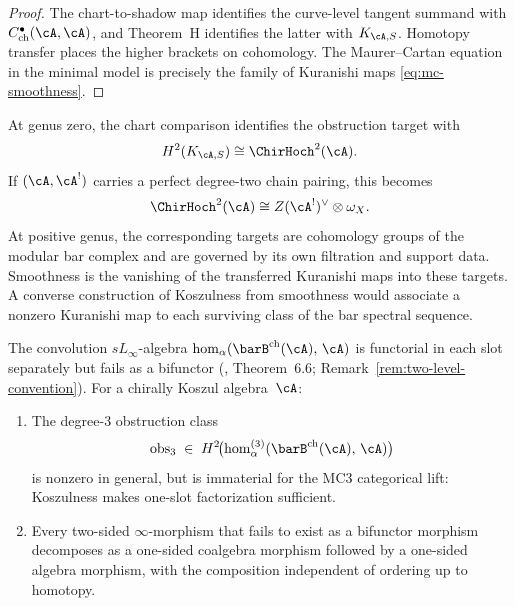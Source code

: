 \begin{proof}
The chart-to-shadow map identifies the curve-level tangent summand
with \(C^\bullet_{\mathrm{ch}}(\cA,\cA)\), and Theorem~H identifies the
latter with \(K_{\cA,S}\).  Homotopy transfer places the higher
brackets on cohomology.  The Maurer--Cartan equation in the minimal
model is precisely the family of Kuranishi maps
\eqref{eq:mc-smoothness}.
\end{proof}

\begin{remark}
\label{rem:mc-smoothness-pbw}
At genus zero, the chart comparison identifies the obstruction target
with
\[
 H^2(K_{\cA,S})\cong\ChirHoch^2(\cA).
\]
If \((\cA,\cA^!)\) carries a perfect degree-two chain pairing, this
becomes
\[
 \ChirHoch^2(\cA)
 \cong Z(\cA^!)^\vee\otimes\omega_X.
\]
At positive genus, the corresponding targets are cohomology groups of
the modular bar complex and are governed by its own filtration and
support data.  Smoothness is the vanishing of the transferred
Kuranishi maps into these targets.  A converse construction of
Koszulness from smoothness would associate a nonzero Kuranishi map to
each surviving class of the bar spectral sequence.
\end{remark}

\begin{theorem}
\label{thm:bifunctor-obstruction-decomposition}%
The convolution $sL_\infty$-algebra
$\operatorname{hom}_\alpha(\barB^{\mathrm{ch}}(\cA),\, \cA)$
is functorial in each slot separately but fails as a bifunctor
\textup{(\cite{RNW19}, Theorem~6.6;
Remark~\textup{\ref{rem:two-level-convention})}}.
For a chirally Koszul algebra~$\cA$:
\begin{enumerate}[label=\textup{(\roman*)}]
\item The degree-$3$ obstruction class
\[
\mathrm{obs}_3
\;\in\;
H^2\!\bigl(
 \operatorname{hom}_\alpha^{(3)}
 (\barB^{\mathrm{ch}}(\cA),\, \cA)
\bigr)
\]
is nonzero in general, but is immaterial for the MC3 categorical
lift: Koszulness makes one-slot factorization sufficient.

\item Every two-sided $\infty$-morphism that fails to exist as a
 bifunctor morphism decomposes as a one-sided coalgebra morphism
 followed by a one-sided algebra morphism, with the composition
 independent of ordering up to homotopy.
\end{enumerate}
\end{theorem}

